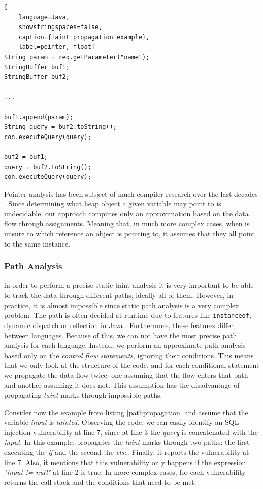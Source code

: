 \begin{lstlisting}[
    language=Java,
    showstringspaces=false,
    caption={Taint propagation example},
    label=pointer, float] 
String param = req.getParameter("name");
StringBuffer buf1;
StringBuffer buf2;

...

buf1.append(param);
String query = buf2.toString();
con.executeQuery(query);

buf2 = buf1;
query = buf2.toString();
con.executeQuery(query);
\end{lstlisting}

Pointer analysis has been subject of much compiler research over the last decades \cite{spath2016boomerang,hind2001pointer}. Since determining what heap object a given variable may point to is undecidable, our approach computes only an approximation based on the data flow through assignments. Meaning that, in much more complex cases, when \toolname{} is unsure to which reference an object is pointing to, it assumes that they all point to the same instance.


\subsubsection{Path Analysis} in order to perform a precise static taint analysis it is very important to be able to track the data through different paths, ideally all of them. However, in practice, it is almost impossible since static path analysis is a very complex problem. The path is often decided at runtime due to features like \texttt{instanceof}, dynamic dispatch or reflection in Java \cite{hammer2008static}. Furthermore, these features differ between languages. Because of this, we can not have the most precise path analysis for each language. Instead, we perform an approximate path analysis based only on the \textit{control flow statements}, ignoring their conditions. This means that we only look at the structure of the code, and for each conditional statement we propagate the data flow twice: one assuming that the flow enters that path and another assuming it does not. This assumption has the disadvantage of propagating \textit{taint} marks through impossible paths.

Consider now the example from listing \ref{pathpropagation} and assume that the variable \textit{input} is \textit{tainted}. Observing the code, we can easily identify an SQL injection vulnerability at line 7, since at line 3 the \textit{query} is concatenated with the \textit{input}.
In this example, \toolname{} propagates the \textit{taint} marks through two paths: the first executing the \textit{if} and the second the \textit{else}. Finally, it reports the vulnerability at line 7. Also, it mentions that this vulnerability only happens if the expression \textit{"input != null"} at line 2 is true. In more complex cases, for each vulnerability \toolname{} returns the call stack and the conditions that need to be met.


